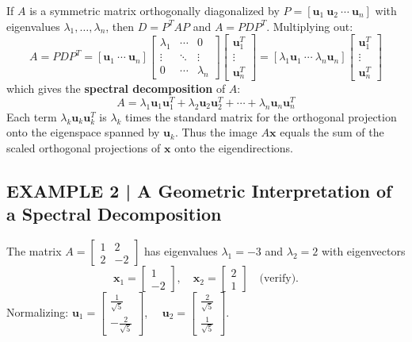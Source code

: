 \documentclass{article}
\theoremstyle{mystyle}
\begin{document}
If $A$ is a symmetric matrix orthogonally diagonalized by
$P = [\mathbf{u}_1\ \mathbf{u}_2\ \cdots\ \mathbf{u}_n]$
with eigenvalues $\lambda_1,\ldots,\lambda_n$, then $D = P^T AP$ and $A = PDP^T$.
Multiplying out:
\[
  A = PDP^T
  = [\mathbf{u}_1\ \cdots\ \mathbf{u}_n]
    \begin{bmatrix}\lambda_1&\cdots&0\\\vdots&\ddots&\vdots\\0&\cdots&\lambda_n\end{bmatrix}
    \begin{bmatrix}\mathbf{u}_1^T\\\vdots\\\mathbf{u}_n^T\end{bmatrix}
  = [\lambda_1\mathbf{u}_1\ \cdots\ \lambda_n\mathbf{u}_n]
    \begin{bmatrix}\mathbf{u}_1^T\\\vdots\\\mathbf{u}_n^T\end{bmatrix}
\]
which gives the \textbf{spectral decomposition} of $A$:
\begin{equation}
  \boxed{A = \lambda_1\mathbf{u}_1\mathbf{u}_1^T + \lambda_2\mathbf{u}_2\mathbf{u}_2^T
            + \cdots + \lambda_n\mathbf{u}_n\mathbf{u}_n^T}
  \tag{7}
\end{equation}
Each term $\lambda_k\mathbf{u}_k\mathbf{u}_k^T$ is $\lambda_k$ times the standard matrix
for the orthogonal projection onto the eigenspace spanned by $\mathbf{u}_k$. Thus the image
$A\mathbf{x}$ equals the sum of the scaled orthogonal projections of $\mathbf{x}$ onto the
eigendirections.

\subsection*{EXAMPLE 2 | A Geometric Interpretation of a Spectral Decomposition}

The matrix $A = \begin{bmatrix}1&2\\2&-2\end{bmatrix}$ has eigenvalues
$\lambda_1=-3$ and $\lambda_2=2$ with eigenvectors
\[
  \mathbf{x}_1=\begin{bmatrix}1\\-2\end{bmatrix},\quad
  \mathbf{x}_2=\begin{bmatrix}2\\1\end{bmatrix}
  \quad\text{(verify).}
\]
Normalizing: $\mathbf{u}_1 = \begin{bmatrix}\tfrac{1}{\sqrt{5}}\\[3pt]-\tfrac{2}{\sqrt{5}}\end{bmatrix}$,
$\quad\mathbf{u}_2 = \begin{bmatrix}\tfrac{2}{\sqrt{5}}\\[3pt]\tfrac{1}{\sqrt{5}}\end{bmatrix}$.
\end{document}
